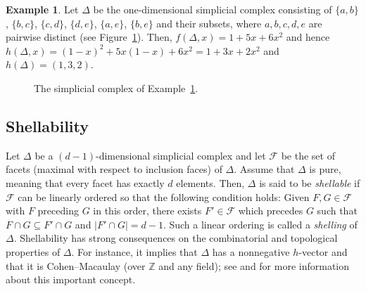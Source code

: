 \documentclass[11pt]{amsart}
\theoremstyle{theorems}
\theoremstyle{definition}
\newtheorem{example}[theorem]{Example}
\newcommand{\fF}{{\mathcal F}}
\newcommand{\ZZ}{{\mathbb Z}}
\begin{document}
\begin{example} \label{ex:one-dim}
Let $\Delta$ be the one-dimensional simplicial complex consisting 
of $\{a, b\}$, $\{b, c\}$, $\{c, d\}$, $\{d, e\}$, $\{a, e\}$, 
$\{b, e\}$ and their subsets, where $a, b, c, d, e$ are pairwise 
distinct (see Figure~\ref{fig:example}). Then, $f(\Delta,x) = 1 + 5x + 6x^2$ and hence 
$h(\Delta,x) = (1-x)^2 + 5x(1-x) + 6x^2 = 1 + 3x + 2x^2$ and 
$h(\Delta) = (1, 3, 2)$. 
 \begin{figure}[ht]
    \centering
    \caption{The simplicial complex of Example~\ref{ex:one-dim}.}
    \label{fig:example}
\end{figure}
\end{example}

\subsection{Shellability}
\label{sec:simplicial}

Let $\Delta$ be a $(d-1)$-dimensional simplicial complex and
let $\fF$ be the set of facets (maximal with respect to inclusion 
faces) of $\Delta$. Assume that $\Delta$ is pure, meaning that 
every facet has exactly $d$ elements. Then, $\Delta$ is said to be 
\emph{shellable} if $\fF$ can be linearly ordered so that the 
following condition holds: Given $F, G \in \fF$ with $F$ preceding 
$G$ in this order, there exists $F' \in \fF$ which precedes $G$ 
such that $F \cap G \subseteq F' \cap G$ and $|F' \cap G| = d-1$. 
Such a linear ordering is called a \emph{shelling} of $\Delta$.
Shellability has strong consequences on the combinatorial and 
topological properties of $\Delta$. For instance, it implies that 
$\Delta$ has a nonnegative $h$-vector and that it is Cohen--Macaulay 
(over $\ZZ$ and any field); see \cite[Section~1]{Bj84}
\cite[Section~7.2]{Bj92} and \cite[Section~III.2]{Sta96} for more 
information about this important concept.
\end{document}
